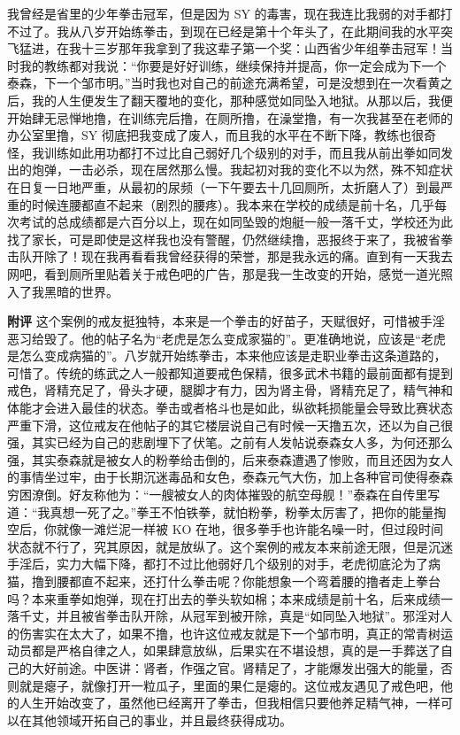 \begin{case}
    我曾经是省里的少年拳击冠军，但是因为 SY 的毒害，现在我连比我弱的对手都打不过了。我从八岁开始练拳击，到现在已经是第十个年头了，在此期间我的水平突飞猛进，在我十三岁那年我拿到了我这辈子第一个奖：山西省少年组拳击冠军！当时我的教练都对我说：“你要是好好训练，继续保持并提高，你一定会成为下一个泰森，下一个邹市明。”当时我也对自己的前途充满希望，可是没想到在一次看黄之后，我的人生便发生了翻天覆地的变化，那种感觉如同坠入地狱。从那以后，我便开始肆无忌惮地撸，在训练完后撸，在厕所撸，在澡堂撸，有一次我甚至在老师的办公室里撸，SY 彻底把我变成了废人，而且我的水平在不断下降，教练也很奇怪，我训练如此用功都打不过比自己弱好几个级别的对手，而且我从前出拳如同发出的炮弹，一击必杀，现在居然那么慢。我起初对我的变化不以为然，殊不知症状在日复一日地严重，从最初的尿频（一下午要去十几回厕所，太折磨人了）到最严重的时候连腰都直不起来（剧烈的腰疼）。我本来在学校的成绩是前十名，几乎每次考试的总成绩都是六百分以上，现在如同坠毁的炮艇一般一落千丈，学校还为此找了家长，可是即使是这样我也没有警醒，仍然继续撸，恶报终于来了，我被省拳击队开除了！现在我再看看我曾经获得的荣誉，那是我永远的痛。直到有一天我去网吧，看到厕所里贴着关于戒色吧的广告，那是我一生改变的开始，感觉一道光照入了我黑暗的世界。

    \textbf{附评} 这个案例的戒友挺独特，本来是一个拳击的好苗子，天赋很好，可惜被手淫恶习给毁了。他的帖子名为“老虎是怎么变成家猫的”。更准确地说，应该是“老虎是怎么变成病猫的”。八岁就开始练拳击，本来他应该是走职业拳击这条道路的，可惜了。传统的练武之人一般都知道要戒色保精，很多武术书籍的最前面都有提到戒色，肾精充足了，骨头才硬，腿脚才有力，因为肾主骨，肾精充足了，精气神和体能才会进入最佳的状态。拳击或者格斗也是如此，纵欲耗损能量会导致比赛状态严重下滑，这位戒友在他帖子的其它楼层说自己有时候一天撸五次，还以为自己很强，其实已经为自己的悲剧埋下了伏笔。之前有人发帖说泰森女人多，为何还那么强，其实泰森就是被女人的粉拳给击倒的，后来泰森遭遇了惨败，而且还因为女人的事情坐过牢，由于长期沉迷毒品和女色，泰森元气大伤，加上各种官司使得泰森穷困潦倒。好友称他为：“一艘被女人的肉体摧毁的航空母舰！”泰森在自传里写道：“我真想一死了之。”拳王不怕铁拳，就怕粉拳，粉拳太厉害了，把你的能量掏空后，你就像一滩烂泥一样被 KO 在地，很多拳手也许能名噪一时，但过段时间状态就不行了，究其原因，就是放纵了。这个案例的戒友本来前途无限，但是沉迷手淫后，实力大幅下降，都打不过比他弱好几个级别的对手，老虎彻底沦为了病猫，撸到腰都直不起来，还打什么拳击呢？你能想象一个弯着腰的撸者走上拳台吗？本来重拳如炮弹，现在打出去的拳头软如棉；本来成绩是前十名，后来成绩一落千丈，并且被省拳击队开除，从冠军到被开除，真是“如同坠入地狱”。邪淫对人的伤害实在太大了，如果不撸，也许这位戒友就是下一个邹市明，真正的常青树运动员都是严格自律之人，如果肆意放纵，后果实在不堪设想，真的是一手葬送了自己的大好前途。中医讲：肾者，作强之官。肾精足了，才能爆发出强大的能量，否则就是瘪子，就像打开一粒瓜子，里面的果仁是瘪的。这位戒友遇见了戒色吧，他的人生开始改变了，虽然他已经离开了拳击，但我相信只要他养足精气神，一样可以在其他领域开拓自己的事业，并且最终获得成功。
\end{case}


